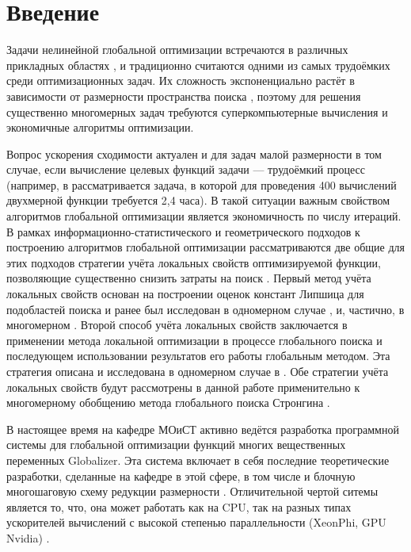 \section{Введение}
Задачи нелинейной глобальной оптимизации встречаются в различных прикладных областях \cite{Kvasov2013, Barkalov2013},
и традиционно считаются одними из самых трудоёмких среди оптимизационных задач.
Их сложность экспоненциально растёт в зависимости от размерности пространства поиска \cite{Vavasis1995},
поэтому для решения существенно многомерных задач требуются суперкомпьютерные вычисления и
экономичные алгоритмы оптимизации.

Вопрос ускорения сходимости актуален и для задач малой размерности в том случае, если вычисление
целевых функций задачи --- трудоёмкий процесс (например, в \cite{Barkalov2013} рассматривается
задача, в которой для проведения 400 вычислений двухмерной функции требуется 2,4 часа).
В такой ситуации важным свойством алгоритмов глобальной оптимизации является экономичность по
числу итераций. В рамках информационно-статистического \cite{strOptBook} и геометрического подходов \cite{piyavskij1972} к
построению алгоритмов глобальной оптимизации рассматриваются две общие для этих подходов
стратегии учёта локальных свойств оптимизируемой функции, позволяющие существенно
снизить затраты на поиск \cite{sergLocalTuning}. Первый метод учёта локальных свойств
основан на построении оценок констант Липшица для подобластей поиска и ранее был
исследован в одномерном случае \cite{sergLocalTuning,nestedLocal}, и, частично, в многомерном \cite{strongSerg}.
Второй способ учёта локальных свойств заключается в применении метода локальной оптимизации в процессе глобального
поиска и последующем использовании результатов его работы глобальным методом. Эта стратегия
описана и исследована в одномерном случае в \cite{sergLocalTuning}. Обе стратегии
учёта локальных свойств будут рассмотрены в данной работе применительно к многомерному
обобщению метода глобального поиска Стронгина \cite{strOptBook}.

В настоящее время на кафедре МОиСТ активно ведётся разработка программной системы
для глобальной оптимизации функций многих вещественных переменных Globalizer.
Эта система включает в себя последние теоретические разработки, сделанные на кафедре в
этой сфере, в том числе и блочную многошаговую схему редукции размерности \cite{blockNested}.
Отличительной чертой ситемы является то, что, она может работать как на CPU, так на
разных типах ускорителей вычислений с высокой степенью параллельности (XeonPhi, GPU Nvidia) \cite{examinArtcle, examinphiArtcle}.

